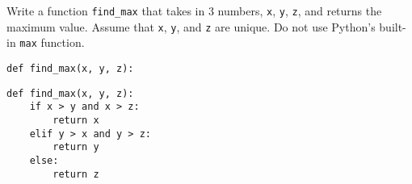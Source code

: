 \begin{blocksection}
\question Write a function \texttt{find\_max} that takes in 3 numbers, \texttt{x}, \texttt{y}, \texttt{z}, and returns the maximum value. Assume that \lstinline{x}, \lstinline{y}, and \lstinline{z} are unique. Do not use Python's built-in \texttt{max} function.

\begin{lstlisting}
def find_max(x, y, z):
\end{lstlisting}
\begin{solution}[2in]
\begin{lstlisting}
def find_max(x, y, z):
    if x > y and x > z:
        return x
    elif y > x and y > z:
        return y
    else:
    	return z
\end{lstlisting}
\end{solution}
\end{blocksection}